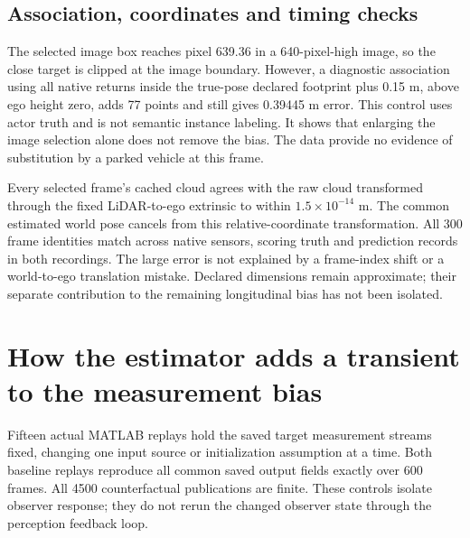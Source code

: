 \documentclass[11pt]{article}
\begin{document}
\subsection{Association, coordinates and timing checks}
The selected image box reaches pixel 639.36 in a 640-pixel-high image, so
the close target is clipped at the image boundary. However, a diagnostic
association using all native returns inside the true-pose declared footprint
plus 0.15 m, above ego height zero, adds 77 points and still gives 0.39445 m
error. This control uses actor truth and is not semantic instance labeling.
It shows that enlarging the image selection alone does not remove the bias.
The data provide no evidence of substitution by a parked vehicle at this frame.

Every selected frame's cached cloud agrees with the raw cloud transformed
through the fixed LiDAR-to-ego extrinsic to within $1.5\times10^{-14}$ m.
The common estimated world pose cancels from this relative-coordinate
transformation. All 300 frame identities match across native sensors,
scoring truth and prediction records in both recordings. The large error is
not explained by a frame-index shift or a world-to-ego translation mistake.
Declared dimensions remain approximate; their separate contribution to the
remaining longitudinal bias has not been isolated.

\section{How the estimator adds a transient to the measurement bias}
Fifteen actual MATLAB replays hold the saved target measurement streams
fixed, changing one input source or initialization assumption at a time.
Both baseline replays reproduce all common saved output fields exactly over
600 frames. All 4500 counterfactual publications are finite. These controls
isolate observer response; they do not rerun the changed observer state
through the perception feedback loop.
\end{document}
